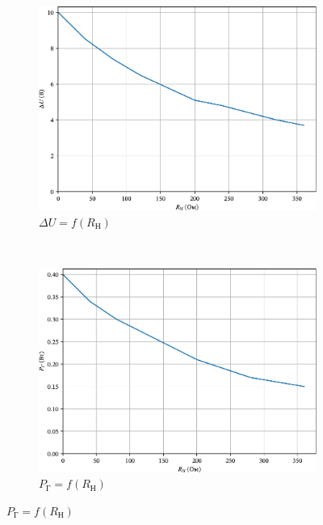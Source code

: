 \documentclass[a4paper,oneside,DIV=10,12pt]{scrartcl}
\begin{document}
\begin{figure}
			\begin{subfigure}[b]{0.49\textwidth}
				\includegraphics[width=\textwidth]{03-delta-u-edited.pdf}
				\caption{$\Delta U = f(R_{\text{Н}})$}
			\end{subfigure}
			~
			\begin{subfigure}[b]{0.49\textwidth}
				\includegraphics[width=\textwidth]{04-p-gen-edited.pdf}
				\caption{$P_{\text{Г}} = f(R_{\text{Н}})$}
			\end{subfigure}
			
			\vspace*{\floatsep}
			

\end{figure}
\end{document}
